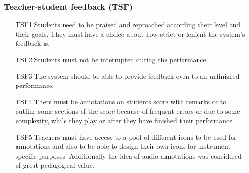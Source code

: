 
\subsubsection{Teacher-student feedback (TSF)}
\begin{itemize}
\item[TSF1] Students need to be praised and reproached according their level and their goals. They must have a choice about how strict or lenient the system’s feedback is.
\item[TSF2] Students must not be interrupted during the performance.
\item[TSF3] The system should be able to provide feedback even to an unfinished performance.
\item[TSF4] There must be annotations on students score with remarks or to outline some sections of the score because of frequent errors or due to some complexity, while they play or after they have finished their performance.
\item[TSF5] Teachers must have access to a pool of different icons to be used for annotations and also to be able to design their own icons for instrument-specific purposes. Additionally the idea of audio annotations was considered of great pedagogical value.
\end{itemize}


